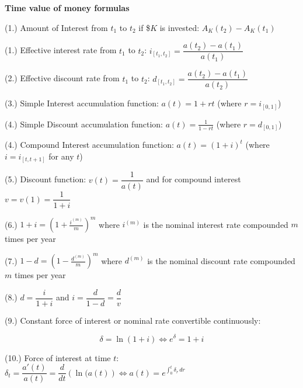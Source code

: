 \documentclass[12pt]{article}
\begin{document}
\begin{center}
    \Large \textbf{Time value of money formulas}
\end{center}

(1.) Amount of Interest from $t_1$ to $t_2$ if \$$K$ is invested: $A_K(t_2)-A_K(t_1)$

(1.) Effective interest rate from $t_1$ to $t_2$: $i_{[t_1,t_2]} = \dfrac{a(t_2)-a(t_1)}{a(t_1)}$

(2.) Effective discount rate from $t_1$ to $t_2$:  $d_{[t_1,t_2]} = \dfrac{a(t_2)-a(t_1)}{a(t_2)}$

(3.) Simple Interest accumulation function: $a(t) = 1+rt$ (where $r = i_{[0,1]}$)

(4.) Simple Discount accumulation function: $a(t) = \frac{1}{1-rt}$ (where $r = d_{[0,1]}$)

(4.) Compound Interest accumulation function: $a(t) = (1+i)^t$ (where $i = i_{[t,t+1]}$ for any $t$)

(5.) Discount function: $v(t)=\dfrac{1}{a(t)}$ and for compound interest $v = v(1)= \dfrac{1}{1+i}$

(6.) $1+i = \left(1+\frac{i^{(m)}}{m}\right)^m $ where $i^{(m)}$ is the nominal interest rate compounded $m$ times per year

(7.) $1-d = \left(1-\frac{d^{(m)}}{m}\right)^m $ where $d^{(m)}$ is the nominal discount rate compounded $m$ times per year

(8.) $d = \dfrac{i}{1+i}$ and $i = \dfrac{d}{1-d} = \dfrac{d}{v}$

(9.) Constant force of interest or nominal rate convertible continuously: 
\vspace{-.5cm}
    
    \[\delta = \ln(1+i) \iff e^{\delta}=1+i\]


(10.) Force of interest at time $t$: $\delta_t = \dfrac{a'(t)}{a(t)} = \dfrac{d}{dt}\left(\ln(a(t)\right) \iff a(t) = e^{\displaystyle \int_0^t \delta_r \, dr}$
\end{document}

